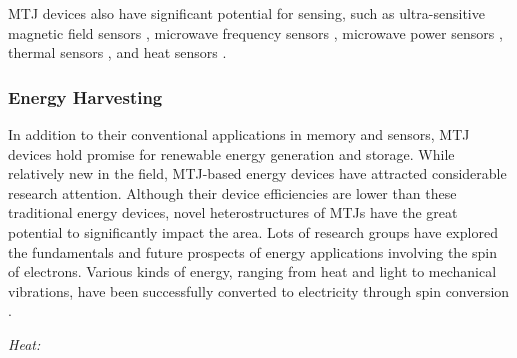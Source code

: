 \documentclass[molecules,review,submit,pdftex,moreauthors]{Definitions/mdpi}
\begin{document}
MTJ devices also have significant potential for sensing, such as ultra-sensitive magnetic field sensors \cite{Paz2014JAP, Ferreira2006JAP},  microwave frequency sensors \cite{Fan2009APL}, microwave power sensors \cite{Fan2014IEEE}, thermal sensors \cite{Sengupta2017SR}, and heat sensors \cite{Bauer2012NM}.





\vspace{12pt}
\subsubsection{Energy Harvesting}


In addition to their conventional applications in memory and sensors, MTJ devices hold promise for renewable energy generation and storage.  While relatively new in the field, MTJ-based energy devices have attracted considerable research attention.  Although their device efficiencies are lower than these traditional energy devices,  novel heterostructures of MTJs have the great potential to significantly impact the area.  Lots of research groups have explored the fundamentals and future prospects of energy applications involving the spin of electrons.  Various kinds of energy, ranging from heat and light to mechanical vibrations, have been successfully converted to electricity through spin conversion  \cite{Bauer2012NM,Puebla2020CM,Otani2017NP}.



\noindent \emph{Heat:}
\end{document}
